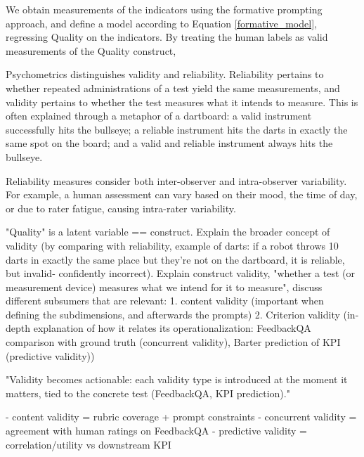 \newpage

We obtain measurements of the indicators using the formative prompting approach, and define a model according to Equation \ref{formative_model}, regressing Quality on the indicators. By treating the human labels as valid measurements of the Quality construct, 



\newpage

Psychometrics distinguishes validity and reliability. Reliability pertains to whether repeated administrations of a test yield the same measurements, and validity pertains to whether the test measures what it intends to measure. This is often explained through a metaphor of a dartboard: a valid instrument successfully hits the bullseye; a reliable instrument hits the darts in exactly the same spot on the board; and a valid and reliable instrument always hits the bullseye. 

Reliability measures consider both inter-observer and intra-observer variability. For example, a human assessment can vary based on their mood, the time of day, or due to rater fatigue, causing intra-rater variability. 

"Quality" is a latent variable == construct. Explain the broader concept of validity (by comparing with reliability, example of darts: if a robot throws 10 darts in exactly the same place but they're not on the dartboard, it is reliable, but invalid- confidently incorrect). Explain construct validity, "whether a test (or measurement device) measures what we intend for it to measure", discuss different subsumers that are relevant: 1. content validity (important when defining the subdimensions, and afterwards the prompts) 2. Criterion validity (in-depth explanation of how it relates its operationalization: FeedbackQA comparison with ground truth (concurrent validity), Barter prediction of KPI (predictive validity))


"Validity becomes actionable: each validity type is introduced at the moment it matters, tied to the concrete test (FeedbackQA, KPI prediction)."

- content validity = rubric coverage + prompt constraints
- concurrent validity = agreement with human ratings on FeedbackQA
- predictive validity = correlation/utility vs downstream KPI

